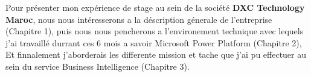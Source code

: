 Pour présenter mon expérience de stage au sein de la société \textbf{DXC Technology Maroc}, nous nous intéresserons a la déscription génerale de l'entreprise (Chapitre 1), puis nous nous pencherons a l'environement technique avec lequels j'ai travaillé durrant ces 6 mois a savoir Microsoft Power Platform (Chapitre 2), Et finnalement j'aborderais les differente mission et tache que j'ai pu effectuer au sein du service Business Intelligence (Chapitre 3).

\newpage